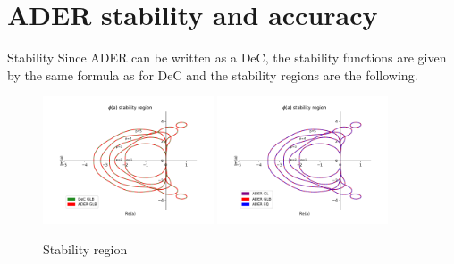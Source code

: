 \documentclass[9pt,compress,t,aspectratio=169]{beamer}
\begin{document}
\section{ADER stability and accuracy}
\begin{frame}{Stability}
	Since ADER can be written as a DeC, the stability functions are 
	given by the same formula as for DeC and the stability regions are the following.
	\begin{figure}[h] 
		\centering
		\includegraphics[width=0.45\textwidth, trim={30 20 30 20},clip]{stab_glb.pdf}
		\includegraphics[width=0.45\textwidth, trim={30 20 30 20},clip]{ader_all.pdf}
		\caption{Stability region}
		\label{fig:stab}
	\end{figure}
\end{frame}
\end{document}
